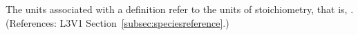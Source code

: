 The units associated with a \SpeciesReference definition refer to the
units of stoichiometry, that is, .  (References: 
L3V1 Section~\ref{subsec:speciesreference}.)
